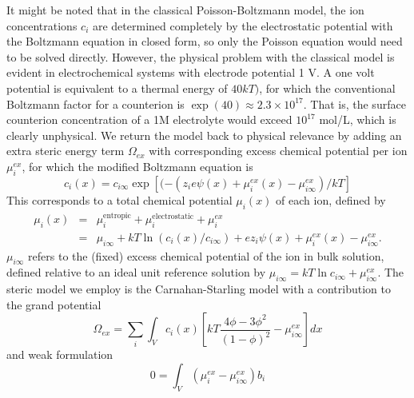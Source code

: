 It might be noted that in the classical Poisson-Boltzmann model, the
ion concentrations $c_i$ are determined completely by the
electrostatic potential with the Boltzmann equation in closed form, so
only the Poisson equation would need to be solved directly. However, the
physical problem with the classical model is evident in electrochemical
systems with electrode potential 1 V. A one volt potential is
equivalent to a thermal energy of $40 kT)$, for which the conventional
Boltzmann factor for a counterion is
$\exp(40)\approx 2.3 \times 10^{17}$.  That is, the surface counterion
concentration of a 1M electrolyte would exceed $10^{17}$ mol/L, which
is clearly unphysical.  We return the model back to physical
relevance by adding an extra steric energy term $\Omega_{ex}$ with
corresponding excess chemical potential per ion $\mu_{i}^{ex}$, for
which the modified Boltzmann equation is
\begin{equation}
    c_i(x)=c_{i\infty}\exp\left[(-(z_i e \psi(x) + \mu_i^{ex}(x)-\mu_{i\infty}^{ex})/kT\right]
    \label{general_Boltzmann}
\end{equation}
This corresponds to a total chemical potential $\mu_i(x)$ of each ion,
defined by
\begin{eqnarray}
  \mu_i(x) &=& \mu_{i}^{\textrm{entropic}} +  \mu_{i}^{\textrm{electrostatic}} +
               \mu_{i}^{ex} \\
{} &  =&\mu_{i\infty} + kT \ln(c_i(x)/c_{i\infty})
         + ez_i \psi(x) + \mu_i^{ex}(x)-\mu_{i\infty}^{ex}.
         \label{chem_pot}
\end{eqnarray}
$\mu_{i\infty}$ refers to the (fixed) excess chemical potential of the
ion in bulk solution, defined relative to an ideal unit
reference solution by $\mu_{i\infty} = kT\ln c_{i\infty} + \mu_{i\infty}^{ex}$.
The steric model we employ is the Carnahan-Starling model
\cite{CarnahanStarling1969} with a contribution to the grand potential
\begin{equation}
    \Omega_{ex} = \sum_{i} \int_{V} c_{i}(x) \left[ kT
    \frac{4\phi - 3\phi^2}{(1-\phi)^2}
    -  \mu_{i\infty}^{ex}
  \right]dx
  \label{CS_energy_functional}
\end{equation}
and weak formulation
\begin{equation}
    0 = \int_{V} (\mu_i^{ex}-\mu_{i\infty}^{ex}) b_i
    \label{weak_CS}
\end{equation}
